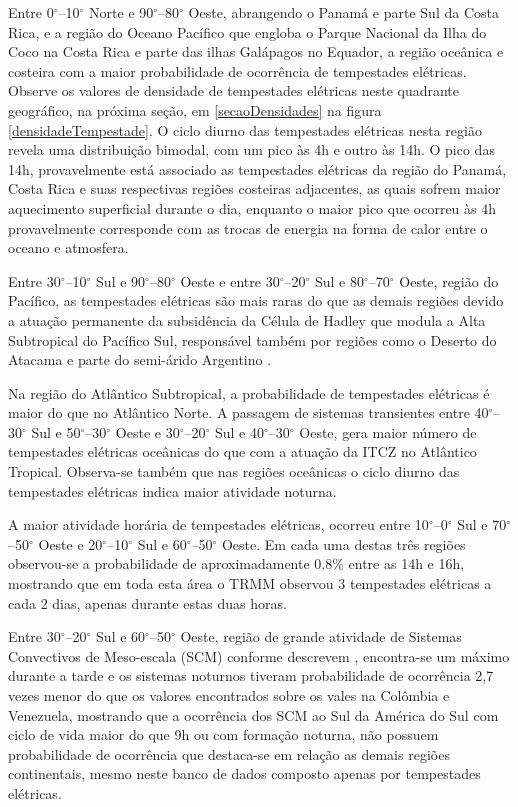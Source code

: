 Entre 0$^{\circ}$--10$^{\circ}$ Norte e 90$^{\circ}$--80$^{\circ}$ Oeste, abrangendo o Panamá e parte Sul da Costa Rica, e a região do Oceano Pacífico que engloba o Parque Nacional da Ilha do Coco na Costa Rica e parte das ilhas Galápagos no Equador,  a  região oceânica e costeira com a maior probabilidade de ocorrência de tempestades elétricas. Observe os valores de densidade de tempestades elétricas neste quadrante geográfico, na próxima seção, em \ref{secaoDensidades} na figura \ref{densidadeTempestade}. O ciclo diurno das tempestades elétricas nesta região revela uma distribuição bimodal, com um pico às 4h e outro às 14h. O pico das 14h, provavelmente está associado as tempestades elétricas da região do Panamá, Costa Rica e suas respectivas regiões costeiras adjacentes, as quais sofrem maior aquecimento superficial durante o dia, enquanto o maior pico que  ocorreu às 4h provavelmente corresponde com as trocas de energia na forma de calor entre o oceano e atmosfera.

Entre 30$^{\circ}$--10$^{\circ}$ Sul e 90$^{\circ}$--80$^{\circ}$ Oeste e entre 30$^{\circ}$--20$^{\circ}$ Sul e 80$^{\circ}$--70$^{\circ}$ Oeste, região do Pacífico, as tempestades elétricas são mais raras do que as demais regiões devido a atuação permanente da subsidência da Célula de Hadley que modula a Alta Subtropical do Pacífico Sul, responsável também por regiões como o Deserto do Atacama e parte do semi-árido Argentino \cite{reboita2010regimes}.

Na região do Atlântico Subtropical, a probabilidade de tempestades elétricas é maior do que no Atlântico Norte. A passagem de sistemas transientes entre 40$^{\circ}$--30$^{\circ}$ Sul e 50$^{\circ}$--30$^{\circ}$ Oeste e 30$^{\circ}$--20$^{\circ}$ Sul e 40$^{\circ}$--30$^{\circ}$ Oeste, gera maior número de tempestades elétricas oceânicas do que com a atuação da ITCZ no Atlântico Tropical. Observa-se também que nas regiões oceânicas o ciclo diurno das tempestades elétricas indica maior atividade noturna.


A maior atividade horária de tempestades elétricas, ocorreu entre 10$^{\circ}$--0$^{\circ}$ Sul e 70$^{\circ}$--50$^{\circ}$ Oeste e 20$^{\circ}$--10$^{\circ}$ Sul e 60$^{\circ}$--50$^{\circ}$ Oeste. Em cada uma destas três regiões observou-se a probabilidade de aproximadamente 0.8\% entre as 14h e 16h, mostrando que em toda esta área o TRMM observou 3 tempestades elétricas a cada 2 dias, apenas durante estas duas horas.


Entre 30$^{\circ}$--20$^{\circ}$ Sul e 60$^{\circ}$--50$^{\circ}$ Oeste,  região de grande atividade de Sistemas Convectivos de Meso-escala (SCM) conforme descrevem , encontra-se um máximo durante a tarde e os sistemas noturnos tiveram probabilidade de ocorrência 2,7 vezes menor do que os valores encontrados sobre os vales na Colômbia e Venezuela, mostrando que a ocorrência dos SCM ao Sul da América do Sul com ciclo de vida maior do que 9h ou com formação noturna, não possuem probabilidade de ocorrência que destaca-se em relação as demais regiões continentais, mesmo neste banco de dados composto apenas por tempestades elétricas. 

